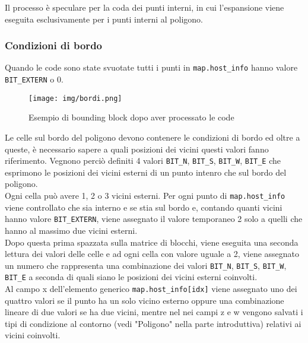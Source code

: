 				Il processo \`{e} speculare per la coda dei punti interni, in cui l'espansione viene eseguita esclusivamente per i punti interni al poligono.
 			\subsubsection{Condizioni di bordo}
 				Quando le code sono state svuotate tutti i punti in \texttt{map.host\_info} hanno valore \texttt{BIT\_EXTERN} o 0. 
 				\newpage
 				\begin{figure}[ht]
 					\centering
 					\texttt{[image: img/bordi.png]}
 					\caption{Esempio di bounding block dopo aver processato le code}
 				\end{figure}
 				Le celle sul bordo del poligono devono contenere le condizioni di bordo ed oltre a queste, \`{e} necessario sapere a quali posizioni dei vicini questi valori fanno riferimento. Vegnono perci\`{o} definiti 4 valori \texttt{BIT\_N}, \texttt{BIT\_S}, \texttt{BIT\_W}, \texttt{BIT\_E} che esprimono le posizioni dei vicini esterni di un punto intenro che sul bordo del poligono.\\
 				Ogni cella pu\`{o} avere 1, 2 o 3 vicini esterni. 
 				Per ogni punto di \texttt{map.host\_info} viene controllato che sia interno e se stia sul bordo e, contando quanti vicini hanno valore \texttt{BIT\_EXTERN}, viene assegnato il valore temporaneo 2 solo a quelli che hanno al massimo due vicini esterni.\\
 				Dopo questa prima spazzata sulla matrice di blocchi, viene eseguita una seconda lettura dei valori delle celle e ad ogni cella con valore uguale a 2, viene assegnato un numero che rappresenta una combinazione dei valori  \texttt{BIT\_N}, \texttt{BIT\_S}, \texttt{BIT\_W}, \texttt{BIT\_E} a seconda di quali siano le posizioni dei vicini esterni coinvolti. \\
 				Al campo x dell'elemento generico \texttt{map.host\_info[idx]} viene assegnato uno dei quattro valori se il punto ha un solo vicino esterno oppure una combinazione lineare di due valori se ha due vicini, mentre nel nei campi z e w vengono salvati i tipi di condizione al contorno (vedi "Poligono" nella parte introduttiva) relativi ai vicini coinvolti.
